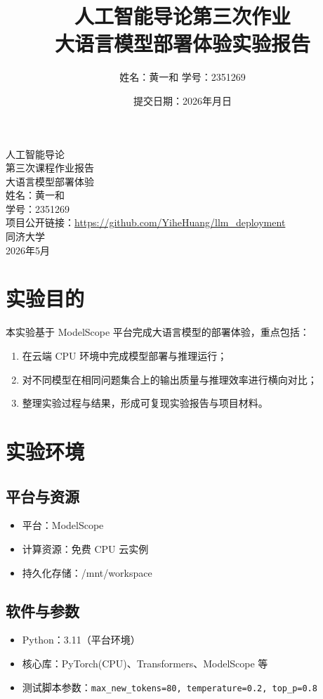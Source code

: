 \documentclass[12pt,a4paper]{ctexart}
\title{\heiti 人工智能导论第三次作业\\大语言模型部署体验实验报告}
\author{姓名：黄一和 \quad 学号：2351269}
\date{提交日期：2026年\underline{\hspace{1.0cm}}月\underline{\hspace{1.0cm}}日}
\begin{document}
\pagestyle{plain}

\begin{titlepage}
  \centering
  \vspace*{2.5cm}
  {\heiti 人工智能导论}\\[1.2cm]
  {\heiti 第三次课程作业报告}\\[0.8cm]
  {\heiti 大语言模型部署体验}\\[3cm]
  {
  姓名：黄一和\\[0.8cm]
  学号：2351269\\[0.8cm]
  项目公开链接：\url{https://github.com/YiheHuang/llm_deployment}\\[0.8cm]
  }
  \vfill
  {同济大学\\[0.3cm]
  2026年5月}
\end{titlepage}

\tableofcontents
\newpage

\section{实验目的}
本实验基于 ModelScope 平台完成大语言模型的部署体验，重点包括：
\begin{enumerate}
  \item 在云端 CPU 环境中完成模型部署与推理运行；
  \item 对不同模型在相同问题集合上的输出质量与推理效率进行横向对比；
  \item 整理实验过程与结果，形成可复现实验报告与项目材料。
\end{enumerate}

\section{实验环境}
\subsection{平台与资源}
\begin{itemize}
  \item 平台：ModelScope
  \item 计算资源：免费 CPU 云实例
  \item 持久化存储：/mnt/workspace
\end{itemize}

\subsection{软件与参数}
\begin{itemize}
  \item Python：3.11（平台环境）
  \item 核心库：PyTorch(CPU)、Transformers、ModelScope 等
  \item 测试脚本参数：\texttt{max\_new\_tokens=80, temperature=0.2, top\_p=0.8}
\end{itemize}
\end{document}

